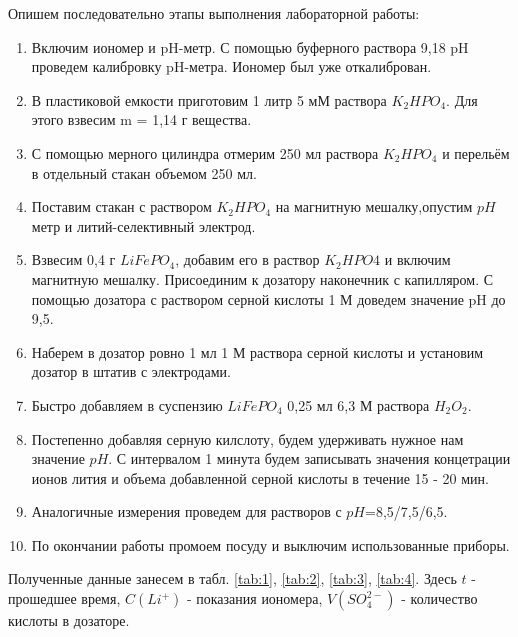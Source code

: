 \documentclass[a4paper,12pt]{article} %
\begin{document}
Опишем последовательно этапы выполнения лабораторной работы:
\begin{enumerate}
    \item Включим иономер и pH-метр. С помощью буферного раствора 9,18 pH проведем калибровку pH-метра. Иономер был уже откалиброван.
    \item  В пластиковой емкости приготовим 1 литр 5 мМ раствора $K_2HPO_4$. Для этого взвесим m = 1,14 г вещества.
    \item С помощью мерного цилиндра отмерим 250 мл раствора $K_2HPO_4$ и перельём в отдельный стакан объемом 250 мл.
    \item Поставим стакан с раствором $K_2HPO_4$ на магнитную мешалку,опустим $pH$ метр и литий-селективный электрод.
    \item Взвесим 0,4 г $LiFePO_4$, добавим его в раствор $K_2HPO4$ и включим магнитную мешалку. Присоединим к дозатору наконечник с капилляром. С помощью дозатора с раствором серной кислоты 1 М доведем значение pH до 9,5.
    \item Наберем в дозатор ровно 1 мл 1 М раствора серной кислоты и установим дозатор в штатив с электродами. 
    \item Быстро добавляем в суспензию $LiFePO_4$ 0,25 мл 6,3 М раствора $H_2O_2$.
    \item Постепенно добавляя серную килслоту, будем удерживать нужное нам значение $pH$. С интервалом 1 минута будем записывать значения концетрации ионов лития и объема добавленной серной кислоты в течение 15 - 20 мин.
    \item Аналогичные измерения проведем для растворов с $pH$=8,5/7,5/6,5.
    \item По окончании работы промоем посуду и выключим использованные приборы.
\end{enumerate}




Полученные данные занесем в табл. \ref{tab:1},  \ref{tab:2},  \ref{tab:3}, \ref{tab:4}. Здесь $t$ - прошедшее время, $C(Li^{+})$ - показания иономера, $V(SO_4^{2-})$ - количество кислоты в дозаторе.
\end{document}

